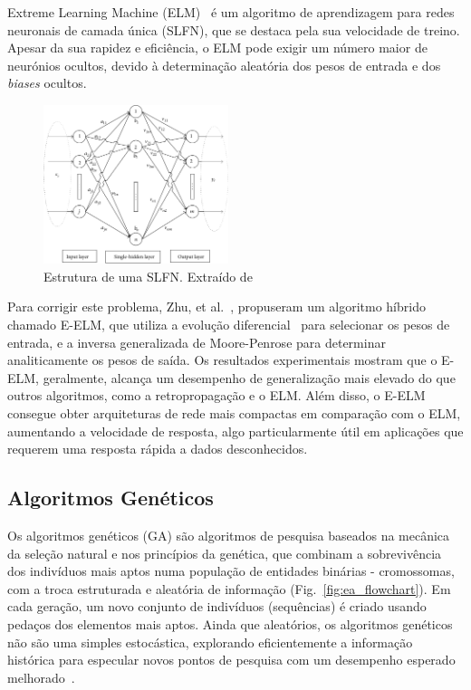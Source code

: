 Extreme Learning Machine (ELM)~\cite{Guang-BinHuang2004ExtremeNetworks} é um algoritmo de aprendizagem para redes neuronais de camada única (SLFN), que se destaca pela sua velocidade de treino.
Apesar da sua rapidez e eficiência, o ELM pode exigir um número maior de neurónios ocultos, devido à determinação aleatória dos pesos de entrada e dos \textit{biases} ocultos.

\begin{figure}[htbp]
    \centering
    \includegraphics[width=0.48\textwidth]{imagens/slfn}
    \caption{Estrutura de uma SLFN. Extraído de~\cite{Erdem2020IntroductionMachines}}
    \label{fig:slfn}
\end{figure}

Para corrigir este problema, Zhu, et al.~\cite{Zhu2005EvolutionaryMachine}, propuseram um algoritmo híbrido chamado E-ELM, que utiliza a evolução diferencial~\cite{Storn1997DifferentialSpaces} para selecionar os pesos de entrada, e a inversa generalizada de Moore-Penrose para determinar analiticamente os pesos de saída.
Os resultados experimentais mostram que o E-ELM, geralmente, alcança um desempenho de generalização mais elevado do que outros algoritmos, como a retropropagação e o ELM. Além disso, o E-ELM consegue obter arquiteturas de rede mais compactas em comparação com o ELM, aumentando a velocidade de resposta, algo particularmente útil em aplicações que requerem uma resposta rápida a dados desconhecidos.

\subsection{Algoritmos Genéticos}\label{subsec:ga}

Os algoritmos genéticos (GA) são algoritmos de pesquisa baseados na mecânica da seleção natural e nos princípios da genética, que combinam a sobrevivência dos indivíduos mais aptos numa população de entidades binárias - cromossomas, com a troca estruturada e aleatória de informação (Fig.~\ref{fig:ea_flowchart}). Em cada geração, um novo conjunto de indivíduos (sequências) é criado usando pedaços dos elementos mais aptos.
Ainda que aleatórios, os algoritmos genéticos não são uma simples  estocástica, explorando eficientemente a informação histórica para especular novos pontos de pesquisa com um desempenho esperado melhorado~\cite{Goldberg1989GeneticLearning}.

